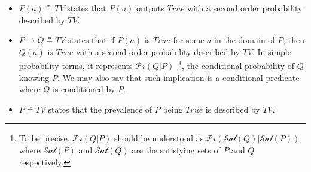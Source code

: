 \documentclass[runningheads]{llncs}
\newcommand{\SP}{\;\;\;}
\newcommand{\TTrue}{\textit{True}}
\newcommand{\TEval}{\textit{Evaluation}}
\newcommand{\TLamb}{\textit{Lambda}}
\newcommand{\TImpl}{\textit{Implication}}
\newcommand{\TTV}{\textit{TV}}
\newcommand{\TBTV}{\langle \TTV \rangle}
\newcommand{\sat}{\mathcal{Sat}}
\newcommand{\prob}{\mathcal{Pr}}
\newcommand{\limp}{\rightarrow}
\begin{document}
\begin{itemize}
\item $P(a) \measeq \TTV$ states that $P(a)$ outputs $\TTrue$ with a
  second order probability described by $\TTV$.
\item
  $P \limp Q \measeq \TTV$ states that if $P(a)$ is $\TTrue$ for some
  $a$ in the domain of $P$, then $Q(a)$ is $\TTrue$ with a second
  order probability described by $\TTV$.  In simple probability terms,
  it represents $\prob(Q|P)$~\footnote{To be precise, $\prob(Q|P)$
    should be understood as $\prob(\sat(Q)|\sat(P))$, where $\sat(P)$
    and $\sat(Q)$ are the satisfying sets of $P$ and $Q$
    respectively.}, the conditional probability of $Q$ knowing $P$.
  We may also say that such implication is a conditional predicate
  where $Q$ is conditioned by $P$.
\item $P \measeq \TTV$ states that the prevalence of $P$ being
  $\TTrue$ is described by $\TTV$.
\end{itemize}
\end{document}
